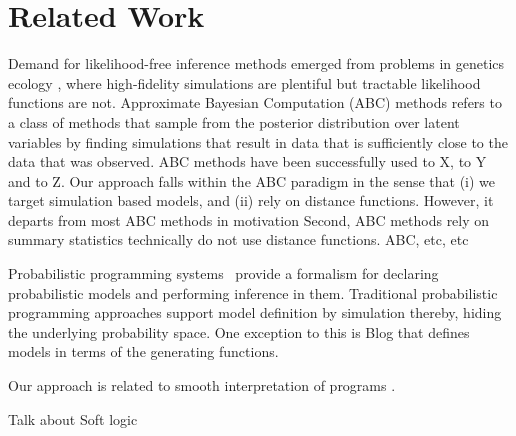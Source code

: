 \section{Related Work}

Demand for likelihood-free inference methods emerged from problems in genetics ecology \cite{}, where high-fidelity simulations are plentiful but tractable likelihood functions are not.
Approximate Bayesian Computation (ABC) methods refers to a class of methods that sample from the posterior distribution over latent variables by finding simulations that result in data that is sufficiently close to the data that was observed.
ABC methods have been successfully used to X, to Y and to Z.
Our approach falls within the ABC paradigm in the sense that (i) we target  simulation based models, and (ii) rely on distance functions.
However, it departs from most ABC methods in motivation
Second, ABC methods rely on summary statistics technically do not use distance functions.
ABC, etc, etc 

Probabilistic programming systems~\citep{milch20071, wood2014new,mansinghka2014venture,goodman2008church,carpenter2017stan} provide a formalism
for declaring probabilistic models and performing inference
in them. Traditional probabilistic programming approaches support model definition by simulation thereby, hiding the underlying probability space. 
One exception to this is Blog \citep{milch20071} 
that defines models in terms of the generating functions.

Our approach is related to smooth interpretation of programs \citep{chaudhuri2010smooth}.

Talk about Soft logic